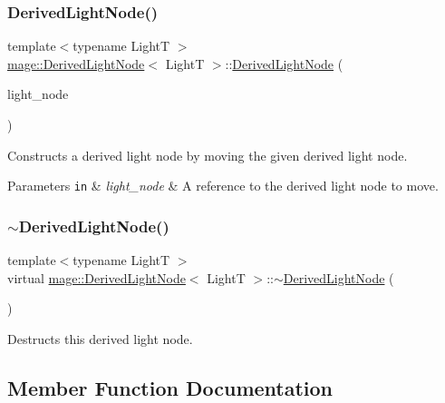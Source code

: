 \subsubsection{\texorpdfstring{Derived\+Light\+Node()}{DerivedLightNode()}\hspace{0.1cm}{\footnotesize\ttfamily [4/4]}}
{\footnotesize\ttfamily template$<$typename LightT $>$ \\
\hyperlink{classmage_1_1_derived_light_node}{mage\+::\+Derived\+Light\+Node}$<$ LightT $>$\+::\hyperlink{classmage_1_1_derived_light_node}{Derived\+Light\+Node} (\begin{DoxyParamCaption}\item[{\hyperlink{classmage_1_1_derived_light_node}{Derived\+Light\+Node}$<$ LightT $>$ \&\&}]{light\+\_\+node }\end{DoxyParamCaption})}

Constructs a derived light node by moving the given derived light node.


\begin{DoxyParams}[1]{Parameters}
\mbox{\tt in}  & {\em light\+\_\+node} & A reference to the derived light node to move. \\
\hline
\end{DoxyParams}
\hypertarget{classmage_1_1_derived_light_node_ad4b2371e323d30eda05744237d4dc4eb}{}\label{classmage_1_1_derived_light_node_ad4b2371e323d30eda05744237d4dc4eb} 
\subsubsection{\texorpdfstring{$\sim$\+Derived\+Light\+Node()}{~DerivedLightNode()}}
{\footnotesize\ttfamily template$<$typename LightT $>$ \\
virtual \hyperlink{classmage_1_1_derived_light_node}{mage\+::\+Derived\+Light\+Node}$<$ LightT $>$\+::$\sim$\hyperlink{classmage_1_1_derived_light_node}{Derived\+Light\+Node} (\begin{DoxyParamCaption}{ }\end{DoxyParamCaption})\hspace{0.3cm}{\ttfamily [virtual]}}

Destructs this derived light node. 

\subsection{Member Function Documentation}
\hypertarget{classmage_1_1_derived_light_node_a38fcbc8d5204f92d0dfd87c1c6d10281}{}\label{classmage_1_1_derived_light_node_a38fcbc8d5204f92d0dfd87c1c6d10281} 

